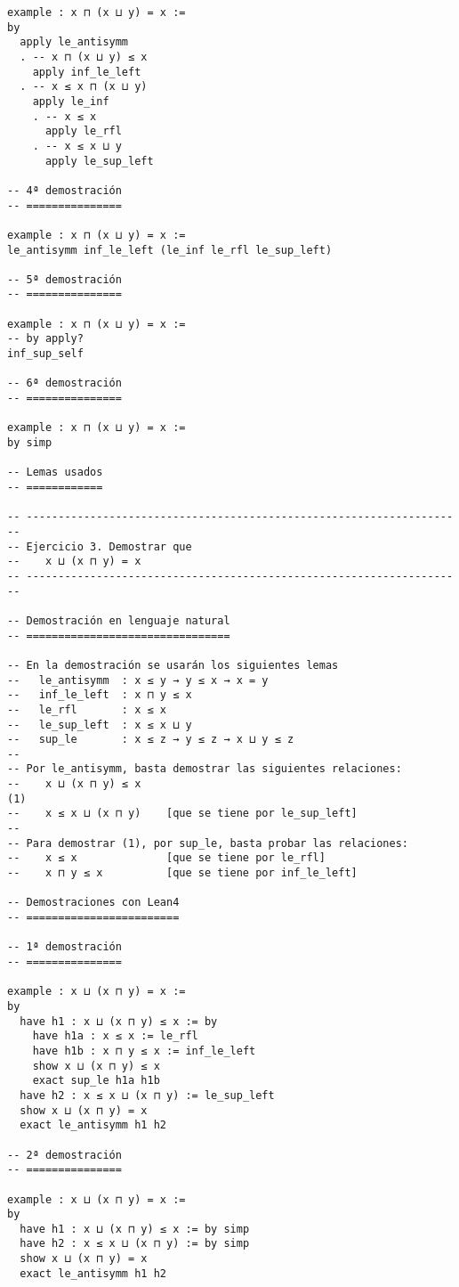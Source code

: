 \begin{verbatim}
example : x ⊓ (x ⊔ y) = x :=
by
  apply le_antisymm
  . -- x ⊓ (x ⊔ y) ≤ x
    apply inf_le_left
  . -- x ≤ x ⊓ (x ⊔ y)
    apply le_inf
    . -- x ≤ x
      apply le_rfl
    . -- x ≤ x ⊔ y
      apply le_sup_left

-- 4ª demostración
-- ===============

example : x ⊓ (x ⊔ y) = x :=
le_antisymm inf_le_left (le_inf le_rfl le_sup_left)

-- 5ª demostración
-- ===============

example : x ⊓ (x ⊔ y) = x :=
-- by apply?
inf_sup_self

-- 6ª demostración
-- ===============

example : x ⊓ (x ⊔ y) = x :=
by simp

-- Lemas usados
-- ============

-- ---------------------------------------------------------------------
-- Ejercicio 3. Demostrar que
--    x ⊔ (x ⊓ y) = x
-- ---------------------------------------------------------------------

-- Demostración en lenguaje natural
-- ================================

-- En la demostración se usarán los siguientes lemas
--   le_antisymm  : x ≤ y → y ≤ x → x = y
--   inf_le_left  : x ⊓ y ≤ x
--   le_rfl       : x ≤ x
--   le_sup_left  : x ≤ x ⊔ y
--   sup_le       : x ≤ z → y ≤ z → x ⊔ y ≤ z
--
-- Por le_antisymm, basta demostrar las siguientes relaciones:
--    x ⊔ (x ⊓ y) ≤ x                                                (1)
--    x ≤ x ⊔ (x ⊓ y)    [que se tiene por le_sup_left]
--
-- Para demostrar (1), por sup_le, basta probar las relaciones:
--    x ≤ x              [que se tiene por le_rfl]
--    x ⊓ y ≤ x          [que se tiene por inf_le_left]

-- Demostraciones con Lean4
-- ========================

-- 1ª demostración
-- ===============

example : x ⊔ (x ⊓ y) = x :=
by
  have h1 : x ⊔ (x ⊓ y) ≤ x := by
    have h1a : x ≤ x := le_rfl
    have h1b : x ⊓ y ≤ x := inf_le_left
    show x ⊔ (x ⊓ y) ≤ x
    exact sup_le h1a h1b
  have h2 : x ≤ x ⊔ (x ⊓ y) := le_sup_left
  show x ⊔ (x ⊓ y) = x
  exact le_antisymm h1 h2

-- 2ª demostración
-- ===============

example : x ⊔ (x ⊓ y) = x :=
by
  have h1 : x ⊔ (x ⊓ y) ≤ x := by simp
  have h2 : x ≤ x ⊔ (x ⊓ y) := by simp
  show x ⊔ (x ⊓ y) = x
  exact le_antisymm h1 h2


\end{verbatim}
